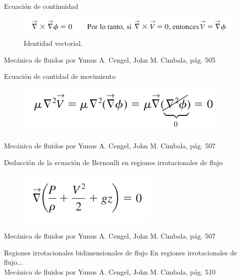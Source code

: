 \begin{frame}{Ecuación de continuidad}
\justifying
\begin{figure}[H]
\centering
\includegraphics[scale=0.35]{Section_Files/S3-imagenes-Jhon/0049.png}
\caption{Identidad vectorial.}
\end{figure}
{\tiny Mecánica de fluidos por Yunus A. Cengel, John M. Cimbala, pág. 505}
\end{frame}


\begin{frame}{Ecuación de cantidad de movimiento}
\justifying
\begin{figure}[H]
\centering
\includegraphics[scale=0.35]{Section_Files/S3-imagenes-Jhon/0060.png}
\end{figure}
{\tiny Mecánica de fluidos por Yunus A. Cengel, John M. Cimbala, pág. 507}
\end{frame}


\begin{frame}{Deducción de la ecuación de Bernoulli en regiones irrotacionales de flujo}
\justifying
\begin{figure}[H]
\centering
\includegraphics[scale=0.35]{Section_Files/S3-imagenes-Jhon/0062.png}
\end{figure}
{\tiny Mecánica de fluidos por Yunus A. Cengel, John M. Cimbala, pág. 507}
\end{frame}


\begin{frame}{Regiones irrotacionales bidimensionales de flujo}
\justifying
En regiones irrotacionales de flujo...
\\
{\tiny Mecánica de fluidos por Yunus A. Cengel, John M. Cimbala, pág. 510}
\end{frame}

